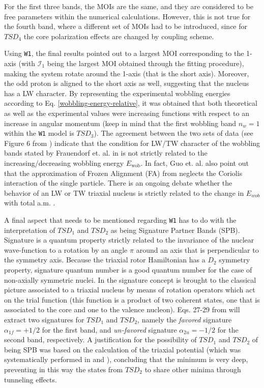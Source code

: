 \documentclass[11pt]{article}
\begin{document}
For the first three bands, the MOIs are the same, and they are considered to be free parameters within the numerical calculations. However, this is not true for the fourth band, where a different set of MOIs had to be introduced, since for $TSD_4$ the core polarization effects are changed by coupling scheme.

Using \texttt{W1}, the final results pointed out to a largest MOI corresponding to the 1-axis (with $\mathcal{I}_1$ being the largest MOI obtained through the fitting procedure), making the system rotate around the 1-axis (that is the short axis). Moreover, the odd proton is aligned to the short axis as well, suggesting that the nucleus has a LW character. By representing the experimental wobbling energies according to Eq. \ref{wobbling-energy-relative}, it was obtained that both theoretical as well as the experimental values were increasing functions with respect to an increase in angular momentum (keep in mind that the first wobbling band $n_w=1$ within the \texttt{W1} model is $TSD_3$). The agreement between the two sets of data (see Figure 6 from \cite{raduta2020approach}) indicate that the condition for LW/TW character of the wobbling bands stated by Frauendorf et. al. in \cite{frauendorf2014transverse} is not strictly related to the increasing/decreasing wobbling energy $E_\text{wob}$. In fact, Guo et. al. \cite{guo2020risk} also point out that the approximation of Frozen Alignment (FA) from \cite{frauendorf2014transverse} neglects the Coriolis interaction of the single particle. There is an ongoing debate whether the behavior of an LW or TW triaxial nucleus is strictly related to the change in $E_{wob}$ with total a.m. \cite{tanabe2017stability,frauendorf2018comment,tanabe2018reply}.


A final aspect that needs to be mentioned regarding \texttt{W1} has to do with the interpretation of $TSD_1$ and $TSD_2$ as being Signature Partner Bands (SPB). Signature is a quantum property strictly related to the invariance of the nuclear wave-function to a rotation by an angle $\pi$ around an axis that is perpendicular to the symmetry axis. Because the triaxial rotor Hamiltonian has a $D_2$ symmetry property, signature quantum number is a good quantum number for the case of non-axially symmetric nuclei. In \cite{raduta2020approach} the signature concept is brought to the classical picture associated to a triaxial nucleus by means of rotation operators which act on the trial function (this function is a product of two coherent states, one that is associated to the core and one to the valence nucleon). Eqs. 27-29 from \cite{raduta2020approach} will extract two signatures for $TSD_1$ and $TSD_2$, namely the \emph{favored} signature $\alpha_{1f}=+1/2$ for the first band, and \emph{un-favored} signature $\alpha_{2u}=-1/2$ for the second band, respectively. A justification for the possibility of $TSD_1$ and $TSD_2$ of being SPB was based on the calculation of the triaxial potential (which was systematically performed in \cite{raduta2017semiclassical} and \cite{raduta2018wobbling}), concluding that the minimum is very deep, preventing in this way the states from $TSD_2$ to share other minima through tunneling effects.
\end{document}
